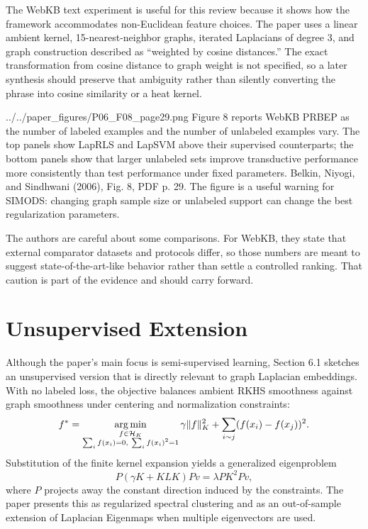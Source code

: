 \documentclass[11pt]{article}
\begin{document}
The WebKB text experiment is useful for this review because it shows how the
framework accommodates non-Euclidean feature choices.  The paper uses a
linear ambient kernel, 15-nearest-neighbor graphs, iterated Laplacians of
degree 3, and graph construction described as ``weighted by cosine
distances.''  The exact transformation from cosine distance to graph weight is
not specified, so a later synthesis should preserve that ambiguity rather
than silently converting the phrase into cosine similarity or a heat kernel.

\paperfigure
  {../../paper_figures/P06_F08_page29.png}
  {Figure 8 reports WebKB PRBEP as the number of labeled examples and the
  number of unlabeled examples vary.  The top panels show LapRLS and LapSVM
  above their supervised counterparts; the bottom panels show that larger
  unlabeled sets improve transductive performance more consistently than test
  performance under fixed parameters.}
  {Belkin, Niyogi, and Sindhwani (2006), Fig. 8, PDF p. 29.}
  {The figure is a useful warning for SIMODS: changing graph sample size or
  unlabeled support can change the best regularization parameters.}

The authors are careful about some comparisons.  For WebKB, they state that
external comparator datasets and protocols differ, so those numbers are meant
to suggest state-of-the-art-like behavior rather than settle a controlled
ranking.  That caution is part of the evidence and should carry forward.

\FloatBarrier

\section{Unsupervised Extension}

Although the paper's main focus is semi-supervised learning, Section 6.1
sketches an unsupervised version that is directly relevant to graph
Laplacian embeddings.  With no labeled loss, the objective balances ambient
RKHS smoothness against graph smoothness under centering and normalization
constraints:
\[
  f^\ast
  =
  \operatorname*{arg\,min}_{\substack{
    f\in\mathcal{H}_K\\
    \sum_i f(x_i)=0,\ \sum_i f(x_i)^2=1
  }}
  \gamma\|f\|_K^2
  +
  \sum_{i\sim j}(f(x_i)-f(x_j))^2 .
\]
Substitution of the finite kernel expansion yields a generalized eigenproblem
\[
  P(\gamma K + KLK)Pv = \lambda P K^2 Pv,
\]
where $P$ projects away the constant direction induced by the constraints.
The paper presents this as regularized spectral clustering and as an
out-of-sample extension of Laplacian Eigenmaps when multiple eigenvectors are
used.
\end{document}
